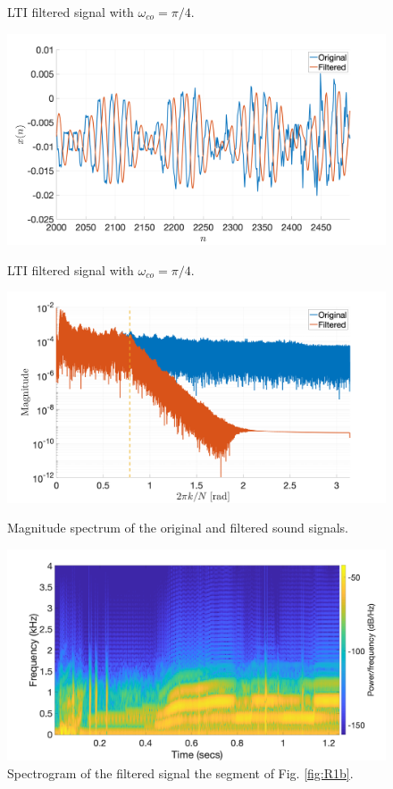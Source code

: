 \documentclass[a4paper, oneside, 11pt]{article}
\begin{document}
\begin{figure}[htbp]
\begin{minipage}[b]{.49\textwidth}
		\caption{LTI filtered signal with $\omega_{co} = \pi/4$.}
		\label{fig:R2f_zoomNoise}
	\end{minipage}
	\hfill
	\begin{minipage}[b]{.49\textwidth}
		\centering
		\includegraphics[width= 1.1\textwidth]{figures/R2f_zoomNormal.png}
		\caption{LTI filtered signal with $\omega_{co} = \pi/4$.}
		\label{fig:R2f_zoomNormal}
	\end{minipage}
\begin{minipage}[b]{.49\textwidth}
	\centering
	\includegraphics[width= 1.1\textwidth]{figures/R2f_spectra.png}
	\caption{Magnitude spectrum of the original and filtered sound signals.}
	\label{fig:R2f}
\end{minipage}
\hfill
\begin{minipage}[b]{.49\textwidth}
	\centering
	\includegraphics[width= 1.1\textwidth]{figures/R2f_spectrogram.png}
	\caption{Spectrogram of the filtered signal the segment of Fig. \ref{fig:R1b}.}
	\label{fig:R2f_spectrogram}
\end{minipage}
\end{figure}
\end{document}

